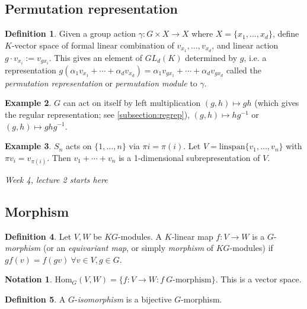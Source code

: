 \documentclass{article}
\newcommand{\Hom}{\text{Hom}}
\theoremstyle{definition}
\newtheorem{defn}{Definition}[subsection]
\newtheorem{example}[defn]{Example}
\newtheorem*{notation}{Notation}
\begin{document}
\subsection{Permutation representation}
\begin{defn}
Given a group action $\gamma:G\times X\rightarrow X$ where $X=\{x_1,\ldots,x_d\}$, define $K$-vector space of formal linear combination of $v_{x_1},\ldots,v_{x_d}$, and linear action $g\cdot v_{x_i}:=v_{gx_i}$. This gives an element of $GL_d(K)$ determined by $g$, i.e. a representation $g(\alpha_1 v_{x_1}+\cdots+\alpha_d v_{x_d})=\alpha_1 v_{gx_1}+\cdots+\alpha_d v_{gx_d}$ called the \textit{permutation representation} or \textit{permutation module} to $\gamma$.
\end{defn}

\begin{example}
$G$ can act on itself by left multiplication $(g,h)\mapsto gh$ (which gives the regular representation; see \ref{subsection:regrep}), $(g,h)\mapsto hg^{-1}$ or $(g,h)\mapsto ghg^{-1}$.
\end{example}

\begin{example}
$S_n$ acts on $\{1,\ldots,n\}$ via $\pi i=\pi(i)$. Let $V=\text{linspan}\{v_1,\ldots,v_n\}$ with $\pi v_i=v_{\pi(i)}$. Then $v_1+\cdots+v_n$ is a 1-dimensional subrepresentation of $V$.
\end{example}

\begin{flushright}
\textit{Week 4, lecture 2 starts here}
\end{flushright}

\subsection{Morphism}

\begin{defn}
Let $V,W$ be $KG$-modules. A $K$-linear map $f:V\rightarrow W$ is a $G$-\textit{morphism} (or an \textit{equivariant map}, or simply \textit{morphism} of $KG$-modules) if $gf(v)=f(gv)\ \forall v\in V, g\in G$.
\end{defn}

\begin{notation}
$\Hom_G(V,W)=\{f:V\rightarrow W:f\ G\text{-morphism}\}$. This is a vector space.
\end{notation}

\begin{defn}
A $G$-\textit{isomorphism} is a bijective $G$-morphism.
\end{defn}
\end{document}
